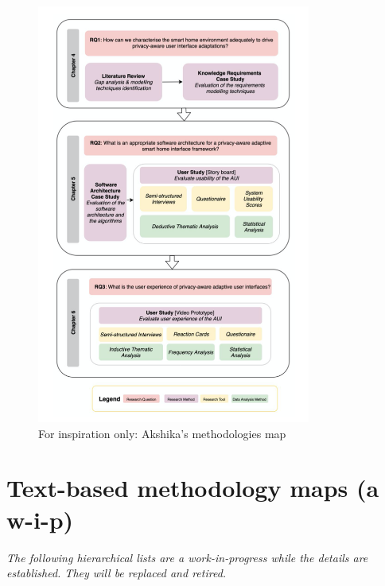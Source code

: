 \begin{figure}
    \centering
    \includegraphics[width=9cm]{images/ephemeral-images-remove-pre-publication/Akshikas-methodology-diagram-from-his-thesis.png}
    \caption{For inspiration only: Akshika's methodologies map}
    \label{fig:akshikas-methodologies-map}
\end{figure}

\hrulefill
\clearpage


\section{Text-based methodology maps (a w-i-p)}
\emph{The following hierarchical lists are a work-in-progress while the details are established. They will be replaced and retired.}


